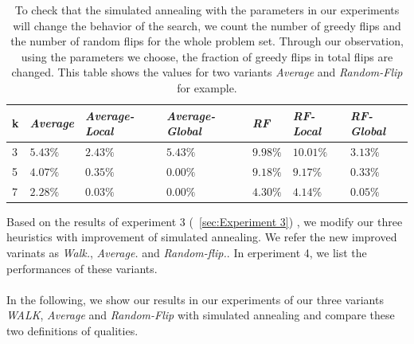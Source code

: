 \documentclass[12pt,a4paper,twoside]{scrartcl}
\numberwithin{equation}{section}
\begin{document}
\begin{table}[H]
\begin{center}
    \begin{tabular}{|l|l|l|l|l|l|p{2cm}|}
\hline 

    k &\emph{Average}&\emph{Average-Local}&\emph{Average-Global} &\emph{RF}& \emph{RF-Local}& \emph{RF-Global} \\ \hline      
    3 &$5.43\%$&$2.43\%$&$5.43\%$&$9.98\%$&$10.01\%$&$3.13\%$\\ \hline
    5& $4.07\%$&$0.35\%$&$0.00\%$&$9.18\%$&$9.17\%$&$0.33\%$\\ \hline
    7&$2.28\%$&$0.03\%$&$0.00\%$&$4.30\%$&$4.14\%$&$0.05\%$\\ \hline
\end{tabular}
\end{center}
\caption{To check that the simulated annealing with the parameters in our experiments will change the behavior of the search, we count the number of greedy flips and the number of random flips for the whole problem set. Through our observation, using the parameters we choose, the fraction of greedy flips in total flips are changed. This table shows the values for two variants \emph{Average} and \emph{Random-Flip} for example. }
\end{table} 
Based on the results of experiment 3 (~\ref{sec:Experiment 3}) , we modify our three heuristics with improvement of simulated annealing. We refer the new improved varinats as \emph{Walk.}, \emph{Average.} and \emph{Random-flip.}. In erperiment 4, we list the performances of these variants.\\
\\
In the following, we show our results in our experiments  of  our three variants \emph{WALK}, \emph{Average} and \emph{Random-Flip} with simulated annealing and compare these two definitions of qualities.
\end{document}
